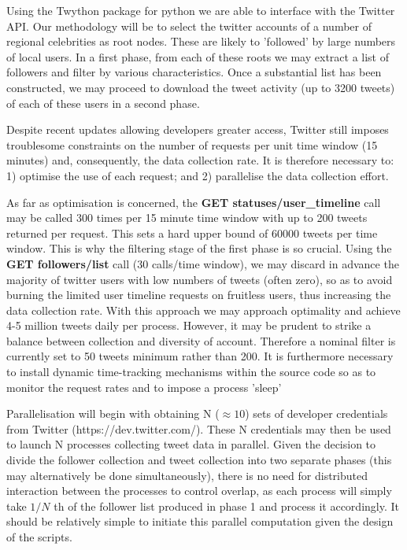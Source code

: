 Using the Twython package for python we are able to interface with the Twitter API. Our methodology will be to select the twitter accounts of a number of regional celebrities as root nodes. These are likely to 'followed' by large numbers of local users. In a first phase, from each of these roots we may extract a list of followers and filter by various characteristics. Once a substantial list has been constructed, we may proceed to download the tweet activity (up to 3200 tweets) of each of these users in a second phase.

Despite recent updates allowing developers greater access, Twitter still imposes troublesome constraints on the number of requests per unit time window (15 minutes) and, consequently, the data collection rate. It is therefore necessary to: 1) optimise the use of each request; and 2) parallelise the data collection effort.

As far as optimisation is concerned, the \textbf{GET statuses/user\_timeline} call may be called 300 times per 15 minute time window with up to 200 tweets returned per request. This sets a hard upper bound of 60000 tweets per time window. This is why the filtering stage of the first phase is so crucial. Using the \textbf{GET followers/list} call (30 calls/time window), we may discard in advance the majority of twitter users with low numbers of tweets (often zero), so as to avoid burning the limited user timeline requests on fruitless users, thus increasing the data collection rate. With this approach we may approach optimality and achieve 4-5 million tweets daily per process. However, it may be prudent to strike a balance between collection and diversity of account. Therefore a nominal filter is currently set to 50 tweets minimum rather than 200. It is furthermore necessary to install dynamic time-tracking mechanisms within the source code so as to monitor the request rates and to impose a process 'sleep'

Parallelisation will begin with obtaining N ($\approx 10$) sets of developer credentials from Twitter (https://dev.twitter.com/). These N credentials may then be used to launch N processes collecting tweet data in parallel. Given the decision to divide the follower collection and tweet collection into two separate phases (this may alternatively be done simultaneously), there is no need for distributed interaction between the processes to control overlap, as each process will simply take $1/N$ th of the follower list produced in phase 1 and process it accordingly. It should be relatively simple to initiate this parallel computation given the design of the scripts.

